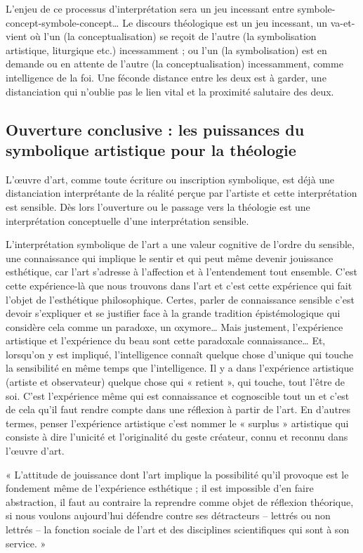 L’enjeu de ce processus d’interprétation sera un jeu incessant entre symbole-concept-symbole-concept… Le discours théologique est un jeu incessant, un va-et-vient où l’un (la conceptualisation) se reçoit de l’autre (la symbolisation artistique, liturgique etc.) incessamment ; ou l’un (la symbolisation) est en demande ou en attente de l’autre (la conceptualisation) incessamment, comme intelligence de la foi. Une féconde distance entre les deux est à garder, une distanciation qui n’oublie pas le lien vital et la proximité salutaire des deux.

\subsection{Ouverture conclusive : les puissances du symbolique artistique pour la théologie}

L’œuvre d’art, comme toute écriture ou inscription symbolique, est déjà une distanciation interprétante de la réalité perçue par l’artiste et cette interprétation est sensible. Dès lors l’ouverture ou le passage vers la théologie est une interprétation conceptuelle d’une interprétation sensible.

L’interprétation symbolique de l’art a une valeur cognitive de l’ordre du sensible, une connaissance qui implique le sentir et qui peut même devenir jouissance esthétique, car l’art s’adresse à l’affection et à l’entendement tout ensemble. C’est cette expérience-là que nous trouvons dans l’art et c’est cette expérience qui fait l’objet de l’esthétique philosophique. Certes, parler de connaissance sensible c’est devoir s’expliquer et se justifier face à la grande tradition épistémologique qui considère cela comme un paradoxe, un oxymore… Mais justement, l’expérience artistique et l’expérience du beau sont cette paradoxale connaissance… Et, lorsqu’on y est impliqué, l’intelligence connaît quelque chose d’unique qui touche la sensibilité en même temps que l’intelligence. Il y a dans l’expérience artistique (artiste et observateur) quelque chose qui « retient », qui touche, tout l’être de soi. C’est l’expérience même qui est connaissance et cognoscible tout un et c’est de cela qu’il faut rendre compte dans une réflexion à partir de l’art. En d’autres termes, penser l’expérience artistique c’est nommer le « surplus » artistique qui consiste à dire l’unicité et l’originalité du geste créateur, connu et reconnu dans l’œuvre d’art.

\vspace{0.24cm}
{\footnotesize « L’attitude de jouissance dont l’art implique la possibilité qu’il provoque est le fondement même de l’expérience esthétique ; il est impossible d’en faire abstraction, il faut au contraire la reprendre comme objet de réflexion théorique, si nous voulons aujourd’hui défendre contre ses détracteurs – lettrés ou non lettrés – la fonction sociale de l’art et des disciplines scientifiques qui sont à son service. »}
\vspace{0.31cm}

